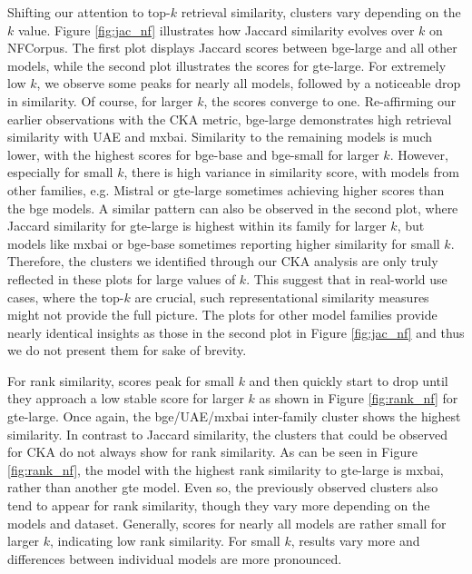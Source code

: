 \documentclass[nonacm,sigconf]{acmart}
\begin{document}
Shifting our attention to top-$k$ retrieval similarity, clusters vary depending on the $k$ value. Figure \ref{fig:jac_nf} illustrates how Jaccard similarity evolves over $k$ on NFCorpus. The first plot displays Jaccard scores between bge-large and all other models, while the second plot illustrates the scores for gte-large. For extremely low $k$, we observe some peaks for nearly all models, followed by a noticeable drop in similarity. Of course, for larger $k$, the scores converge to one. Re-affirming our earlier observations with the CKA metric, bge-large demonstrates high retrieval similarity with UAE and mxbai. Similarity to the remaining models is much lower, with the highest scores for bge-base and bge-small for larger $k$. However, especially for small $k$, there is high variance in similarity score, with models from other families, e.g. Mistral or gte-large sometimes achieving higher scores than the bge models. A similar pattern can also be observed in the second plot, where Jaccard similarity for gte-large is highest within its family for larger $k$, but models like mxbai or bge-base sometimes reporting higher similarity for small $k$. Therefore, the clusters we identified through our CKA analysis are only truly reflected in these plots for large values of $k$. This suggest that in real-world use cases, where the top-$k$ are crucial, such representational similarity measures might not provide the full picture. The plots for other model families provide nearly identical insights as those in the second plot in Figure \ref{fig:jac_nf} and thus we do not present them for sake of brevity. 

For rank similarity, scores peak for small $k$ and then quickly start to drop until they approach a low stable score for larger $k$ as shown in Figure \ref{fig:rank_nf} for gte-large. Once again, the bge/UAE/mxbai inter-family cluster shows the highest similarity. In contrast to Jaccard similarity, the clusters that could be observed for CKA do not always show for rank similarity. As can be seen in Figure \ref{fig:rank_nf}, the model with the highest rank similarity to gte-large is mxbai, rather than another gte model. Even so, the previously observed clusters also tend to appear for rank similarity, though they vary more depending on the models and dataset. Generally, scores for nearly all models are rather small for larger $k$, indicating low rank similarity. For small $k$, results vary more and differences between individual models are more pronounced.
\end{document}

